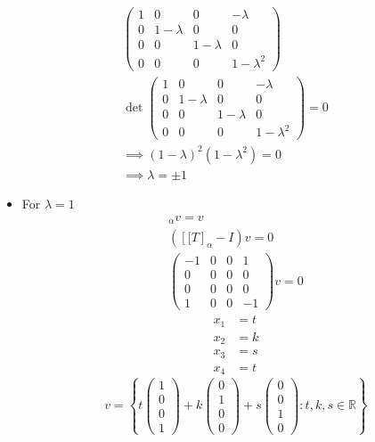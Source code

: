 \begin{enumerate}
\begin{gather}
\begin{pmatrix}
1 & 0 & 0 & -\lambda\\
0 & 1-\lambda & 0 & 0\\
0 & 0 & 1-\lambda & 0\\
0 & 0 & 0 &1 -\lambda^2
\end{pmatrix}\\
\det{\begin{pmatrix}
1 & 0 & 0 & -\lambda\\
0 & 1-\lambda & 0 & 0\\
0 & 0 & 1-\lambda & 0\\
0 & 0 & 0 &1 -\lambda^2
\end{pmatrix}} = 0\\
\implies (1-\lambda)^2(1-\lambda^2) =0\\
\implies \lambda = \pm 1
\end{gather}
\begin{itemize}
\item For $\lambda = 1$
\begin{gather}
[\mathsf{T}]_\alpha v = v\\
([\mathsf[T]_\alpha - I)v = 0\\
\begin{pmatrix}
-1 & 0 & 0 & 1\\
0 & 0 & 0 & 0\\
0 & 0 & 0 & 0\\
1 & 0 & 0 & -1
\end{pmatrix}v =0
\end{gather}
\begin{align}
x_1 &= t\\
x_2 &= k\\
x_3 &= s\\
x_4 &= t
\end{align}
\begin{equation}
v = \left\{t\begin{pmatrix}1\\0\\0\\1\end{pmatrix}
  +k\begin{pmatrix}0\\1\\0\\0\end{pmatrix}+s\begin{pmatrix}0\\0\\1\\0\end{pmatrix}\colon
  t,k,s \in \mathbb{R}\right\}

\end{equation}
\end{itemize}
\end{enumerate}
